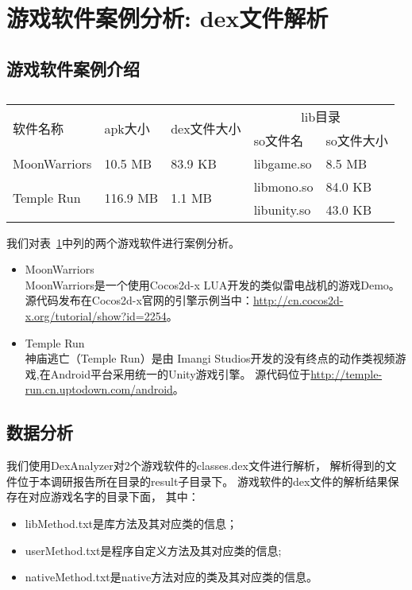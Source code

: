 \section{游戏软件案例分析: dex文件解析}
\label{dexanalysis}
\subsection{游戏软件案例介绍}
\label{sec:dexanalysis:case}
\begin{table}[htbp]
\caption{}
\label{tab:games}
\begin{tabular}{|p{2.5cm}|p{2cm}|p{2.1cm}|p{2cm}|p{2cm}|}
\hline
\multirow{2}{*}{软件名称} & \multirow{2}{*}{apk大小}  & \multirow{2}{*}{dex文件大小} & \multicolumn{2}{|c|}{lib目录} \\
\cline{4-5}
& & & so文件名 & so文件大小\\
\hline
MoonWarriors & 10.5 MB & 83.9 KB & libgame.so & 8.5 MB \\
\hline
\multirow{2}{*}{Temple Run} & \multirow{2}{*}{116.9 MB} & \multirow{2}{*}{1.1 MB} & libmono.so & 84.0 KB\\
\cline{4-5}
& & & libunity.so & 43.0 KB\\
\hline
\end{tabular}
\end{table}

我们对表~\ref{tab:games}中列的两个游戏软件进行案例分析。
\begin{itemize}
\item MoonWarriors\\
MoonWarriors是一个使用Cocos2d-x LUA开发的类似雷电战机的游戏Demo。
源代码发布在Cocos2d-x官网的引擎示例当中：\url{http://cn.cocos2d-x.org/tutorial/show?id=2254}。

\item Temple Run\\
神庙逃亡（Temple Run）是由 Imangi Studios开发的没有终点的动作类视频游戏,在Android平台采用统一的Unity游戏引擎。
源代码位于\url{http://temple-run.cn.uptodown.com/android}。

\end{itemize}

\subsection{数据分析}
\label{sec:dexanalysis:casestudy}
我们使用DexAnalyzer对2个游戏软件的classes.dex文件进行解析，
解析得到的文件位于本调研报告所在目录的result子目录下。
游戏软件的dex文件的解析结果保存在对应游戏名字的目录下面，
其中：
\begin{itemize}
\item libMethod.txt是库方法及其对应类的信息；
\item userMethod.txt是程序自定义方法及其对应类的信息;
\item nativeMethod.txt是native方法对应的类及其对应类的信息。
\end{itemize}

